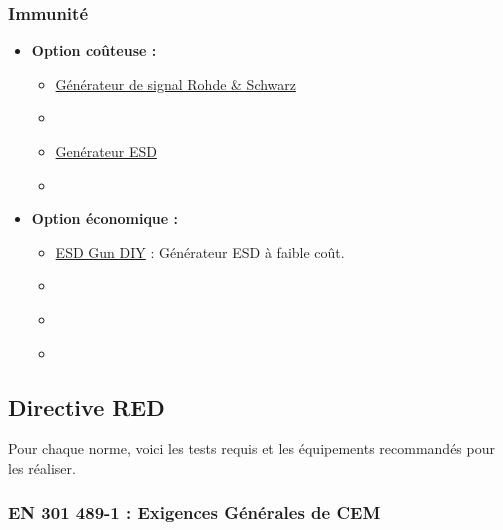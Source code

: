 \documentclass[a4paper,12pt]{article}
\begin{document}
\subsubsection{Immunité}
\begin{itemize}
    \item \textbf{Option coûteuse :}
          \begin{itemize}
              \item \href{https://www.keysight.com/us/en/assets/7018-05702/technical-overviews/5992-2241.pdf}{Générateur de signal Rohde \& Schwarz}
              \item \href{}{} %
              \item \href{https://www.schloeder-emc.com/emc-products/emc-test-and-measurement-system/esd-simulators/esd-simulator-165-kv.html}{Genérateur ESD} %
              \item \href{}{} %
          \end{itemize}
    \item \textbf{Option économique :}
          \begin{itemize}
              \item \href{https://www.crowdsupply.com/era-instruments/erasynth-micro}{ESD Gun DIY} : Générateur ESD à faible coût.
              \item \href{}{} %
              \item \href{}{} %
              \item \href{}{} %
          \end{itemize}
\end{itemize}

\newpage

\subsection{Directive RED}
Pour chaque norme, voici les tests requis et les équipements recommandés pour les réaliser.

\subsubsection{EN 301 489-1 : Exigences Générales de CEM} %
\end{document}
